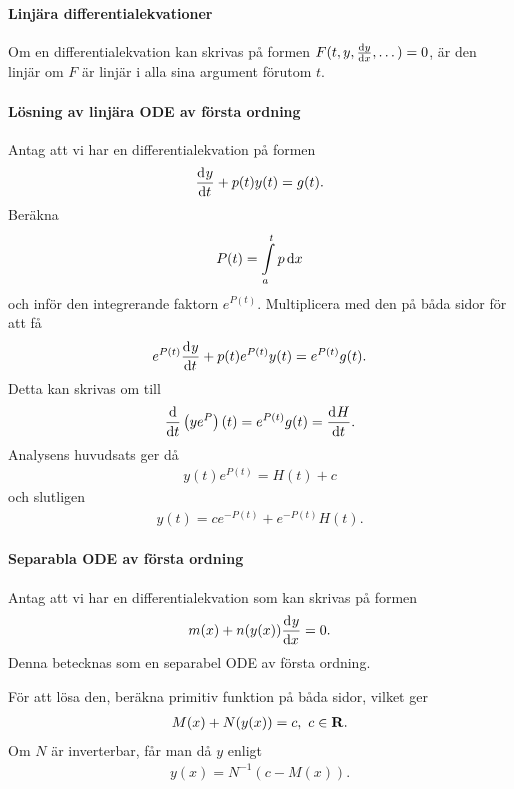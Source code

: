 \paragraph{Linjära differentialekvationer}
Om en differentialekvation kan skrivas på formen $F(t, y, \dv{y}{x}, \dots) = 0$, är den linjär om $F$ är linjär i alla sina argument förutom $t$.

\paragraph{Lösning av linjära ODE av första ordning}
Antag att vi har en differentialekvation på formen
\begin{align*}
	\dv[]{y}{t} (t) + p(t)y(t) = g(t).
\end{align*}
Beräkna
\begin{align*}
	P(t) = \int\limits_{a}^{t}p\dd{x}
\end{align*}
och inför den integrerande faktorn $e^{P(t)}$. Multiplicera med den på båda sidor för att få
\begin{align*}
	e^{P(t)}\dv[]{y}{t} (t) + p(t)e^{P(t)}y(t) = e^{P(t)}g(t).
\end{align*}
Detta kan skrivas om till
\begin{align*}
	\dv{t}\left(ye^{P}\right)(t) = e^{P(t)}g(t) = \dv[]{H}{t} (t).
\end{align*}
Analysens huvudsats ger då
\begin{align*}
	y(t)e^{P(t)} = H(t) + c
\end{align*}
och slutligen
\begin{align*}
	y(t) = ce^{-P(t)} + e^{-P(t)}H(t).
\end{align*}

\paragraph{Separabla ODE av första ordning}
Antag att vi har en differentialekvation som kan skrivas på formen
\begin{align*}
	m(x) + n(y(x))\dv[]{y}{x} (x) = 0.
\end{align*}
Denna betecknas som en separabel ODE av första ordning.

För att lösa den, beräkna primitiv funktion på båda sidor, vilket ger
\begin{align*}
	M(x) + N(y(x)) = c,\ c\in\mathbf{R}.
\end{align*}
Om $N$ är inverterbar, får man då $y$ enligt
\begin{align*}
	y(x) = N^{-1}(c - M(x)).
\end{align*}

